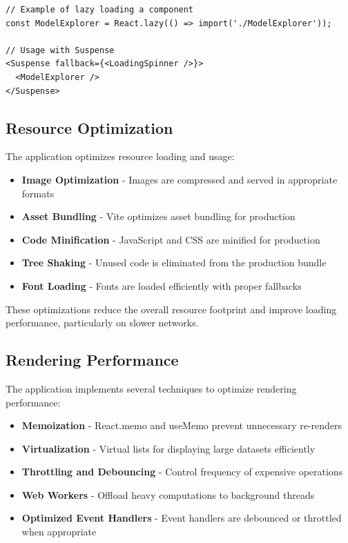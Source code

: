 \begin{verbatim}
// Example of lazy loading a component
const ModelExplorer = React.lazy(() => import('./ModelExplorer'));

// Usage with Suspense
<Suspense fallback={<LoadingSpinner />}>
  <ModelExplorer />
</Suspense>
\end{verbatim}

\subsection{Resource Optimization}

The application optimizes resource loading and usage:

\begin{itemize}
  \item \textbf{Image Optimization} - Images are compressed and served in appropriate formats
  \item \textbf{Asset Bundling} - Vite optimizes asset bundling for production
  \item \textbf{Code Minification} - JavaScript and CSS are minified for production
  \item \textbf{Tree Shaking} - Unused code is eliminated from the production bundle
  \item \textbf{Font Loading} - Fonts are loaded efficiently with proper fallbacks
\end{itemize}

These optimizations reduce the overall resource footprint and improve loading performance, particularly on slower networks.

\subsection{Rendering Performance}

The application implements several techniques to optimize rendering performance:

\begin{itemize}
  \item \textbf{Memoization} - React.memo and useMemo prevent unnecessary re-renders
  \item \textbf{Virtualization} - Virtual lists for displaying large datasets efficiently
  \item \textbf{Throttling and Debouncing} - Control frequency of expensive operations
  \item \textbf{Web Workers} - Offload heavy computations to background threads
  \item \textbf{Optimized Event Handlers} - Event handlers are debounced or throttled when appropriate
\end{itemize}

